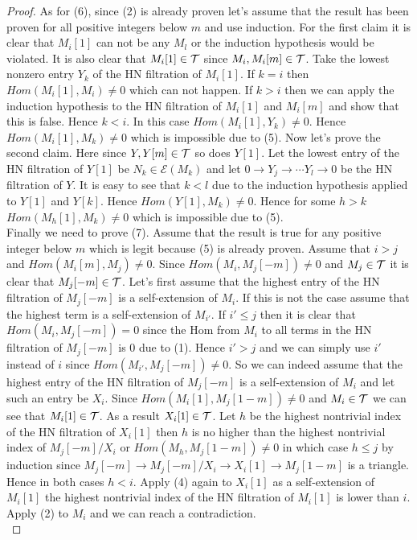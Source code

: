 \begin{proof}
\indent As for (6), since (2) is already proven let's assume that the result has been proven for all positive integers below $m$ and use induction. For the first claim it is clear that $M_i[1]$ can not be any $M_l$ or the induction hypothesis would be violated. It is also clear that $M_i[1]\in\mathcal{T}$ since $M_i, M_i[m]\in\mathcal{T}$. Take the lowest nonzero entry $Y_k$ of the HN filtration of $M_i[1]$. If $k=i$ then $Hom(M_i[1],M_i)\neq 0$ which can not happen. If $k>i$ then we can apply the induction hypothesis to the HN filtration of $M_i[1]$ and $M_i[m]$ and show that this is false. Hence $k<i$. In this case $Hom(M_i[1],Y_k)\neq 0$. Hence $Hom(M_i[1],M_k)\neq 0$ which is impossible due to (5). Now let's prove the second claim. Here since $Y,Y[m]\in\mathcal{T}$ so does $Y[1]$. Let the lowest entry of the HN filtration of $Y[1]$ be $N_k\in\mathcal{E}(M_k)$ and let $0\to Y_j\to\cdots Y_l\to 0$ be the HN filtration of $Y$. It is easy to see that $k<l$ due to the induction hypothesis applied to $Y[1]$ and $Y[k]$. Hence $Hom(Y[1],M_k)\neq 0$. Hence for some $h>k$ $Hom(M_h[1],M_k)\neq 0$ which is impossible due to (5).\\
\indent Finally we need to prove (7). Assume that the result is true for any positive integer below $m$ which is legit because (5) is already proven. Assume that $i>j$ and $Hom(M_i[m],M_j) \neq 0$. Since $Hom(M_i, M_j[-m])\neq 0$ and $M_j\in\mathcal{T}$ it is clear that $M_j[-m]\in\mathcal{T}$. Let's first assume that the highest entry of the HN filtration of $M_j[-m]$ is a self-extension of $M_i$. If this is not the case assume that the highest term is a self-extension of $M_{i'}$. If $i'\leq j$ then it is clear that $Hom(M_i,M_j[-m])=0$ since the Hom from $M_i$ to all terms in the HN filtration of $M_j[-m]$ is 0 due to (1). Hence $i'>j$ and we can simply use $i'$ instead of $i$ since $Hom(M_{i'},M_j[-m])\neq 0$. So we can indeed assume that the highest entry of the HN filtration of $M_j[-m]$ is a self-extension of $M_i$ and let such an entry be $X_i$. Since $Hom(M_i[1], M_j[1-m])\neq 0$ and $M_i\in\mathcal{T}$ we can see that $M_i[1]\in\mathcal{T}$. As a result $X_i[1]\in\mathcal{T}$. Let $h$ be the highest nontrivial index of the HN filtration of $X_i[1]$ then $h$ is no higher than the highest nontrivial index of $M_j[-m]/X_i$ or $Hom(M_h,M_j[1-m])\neq 0$ in which case $h\leq j$ by induction since $M_j[-m]\to M_j[-m]/X_i\to X_i[1]\to M_j[1-m]$ is a triangle. Hence in both cases $h<i$. Apply (4) again to $X_i[1]$ as a self-extension of $M_i[1]$ the highest nontrivial index of the HN filtration of $M_i[1]$ is lower than $i$. Apply (2) to $M_i$ and we can reach a contradiction.\\
\end{proof}
